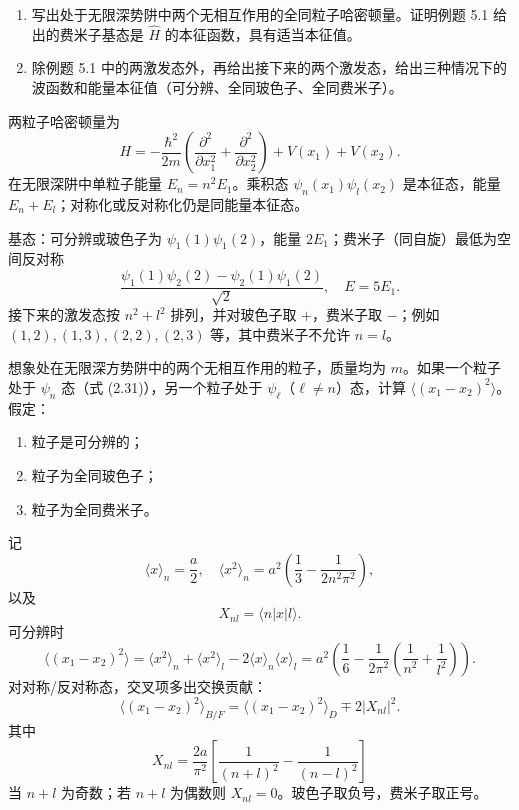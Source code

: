 \begin{question}
\begin{enumerate}
\item 写出处于无限深势阱中两个无相互作用的全同粒子哈密顿量。证明例题 5.1 给出的费米子基态是 $\hat H$ 的本征函数，具有适当本征值。
\item 除例题 5.1 中的两激发态外，再给出接下来的两个激发态，给出三种情况下的波函数和能量本征值（可分辨、全同玻色子、全同费米子）。
\end{enumerate}
\end{question}
\begin{solution}

两粒子哈密顿量为
\[
H=-\frac{\hbar^2}{2m}\left(\frac{\partial^2}{\partial x_1^2}+\frac{\partial^2}{\partial x_2^2}\right)+V(x_1)+V(x_2).
\]
在无限深阱中单粒子能量 $E_n=n^2E_1$。乘积态 $\psi_n(x_1)\psi_l(x_2)$ 是本征态，能量 $E_n+E_l$；对称化或反对称化仍是同能量本征态。

基态：可分辨或玻色子为 $\psi_1(1)\psi_1(2)$，能量 $2E_1$；费米子（同自旋）最低为空间反对称
\[
\frac{\psi_1(1)\psi_2(2)-\psi_2(1)\psi_1(2)}{\sqrt2},
\quad E=5E_1.
\]
接下来的激发态按 $n^2+l^2$ 排列，并对玻色子取 $+$，费米子取 $-$；例如 $(1,2),(1,3),(2,2),(2,3)$ 等，其中费米子不允许 $n=l$。

\end{solution}

\begin{question}
想象处在无限深方势阱中的两个无相互作用的粒子，质量均为 $m$。如果一个粒子处于 $\psi_n$ 态（式 (2.31)），另一个粒子处于 $\psi_\ell$（$\ell\ne n$）态，计算 $\langle (x_1-x_2)^2\rangle$。假定：
\begin{enumerate}
\item 粒子是可分辨的；
\item 粒子为全同玻色子；
\item 粒子为全同费米子。
\end{enumerate}

\par\smallskip
{}

\end{question}
\begin{solution}

记
\[
\langle x\rangle_n=\frac a2,
\quad
\langle x^2\rangle_n=a^2\left(\frac13-\frac{1}{2n^2\pi^2}\right),
\]
以及
\[
X_{nl}=\langle n|x|l\rangle.
\]
可分辨时
\[
\langle(x_1-x_2)^2\rangle=\langle x^2\rangle_n+\langle x^2\rangle_l-2\langle x\rangle_n\langle x\rangle_l
=a^2\left(\frac16-\frac{1}{2\pi^2}\left(\frac1{n^2}+\frac1{l^2}\right)\right).
\]
对对称/反对称态，交叉项多出交换贡献：
\[
\langle(x_1-x_2)^2\rangle_{B/F}=\langle(x_1-x_2)^2\rangle_{D}
\mp 2|X_{nl}|^2.
\]
其中
\[
X_{nl}=\frac{2a}{\pi^2}\left[\frac{1}{(n+l)^2}-\frac{1}{(n-l)^2}\right]
\]
当 $n+l$ 为奇数；若 $n+l$ 为偶数则 $X_{nl}=0$。玻色子取负号，费米子取正号。

\end{solution}

